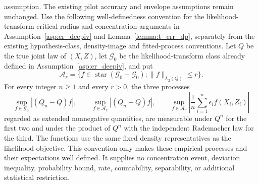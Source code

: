 \begin{lemma}
assumption. The existing pilot accuracy and envelope assumptions remain unchanged. Use the following well-definedness convention for the likelihood-transform critical-radius and concentration arguments in Assumption~\ref{asp:cr_deepiv} and Lemma~\ref{lemma:t_err_dp}, separately from the existing hypothesis-class, density-image and fitted-process conventions. Let $Q$ be the true joint law of $(X,Z)$, let $\mathcal G_0$ be the likelihood-transform class already defined in Assumption~\ref{asp:cr_deepiv}, and put \[ \mathcal A_r=\{f\in\operatorname{star}(\mathcal G_0-\mathcal G_0):\|f\|_{L_2(Q)}\leqslant r\}. \] For every integer $n\geqslant1$ and every $r>0$, the three processes \[ \sup_{f\in\mathcal G_0}|(Q_n-Q)f|,\qquad \sup_{f\in\mathcal A_r}|(Q_n-Q)f|,\qquad \sup_{f\in\mathcal A_r}\left|\frac1n\sum_{i=1}^n\epsilon_i f(X_i,Z_i)\right| \] regarded as extended nonnegative quantities, are measurable under $Q^n$ for the first two and under the product of $Q^n$ with the independent Rademacher law for the third. The functions use the same fixed density representatives as the likelihood objective. This convention only makes these empirical processes and their expectations well defined. It supplies no concentration event, deviation inequality, probability bound, rate, countability, separability, or additional statistical restriction.
\end{lemma}

